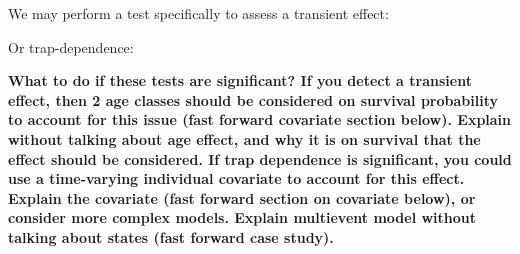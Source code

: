 \documentclass[
  12pt,
]{krantz}
\newenvironment{Shaded}{\begin{snugshade}}{\end{snugshade}}
\newcommand{\DocumentationTok}[1]{\textcolor[rgb]{0.56,0.35,0.01}{\textbf{\textit{#1}}}}
\newcommand{\FunctionTok}[1]{\textcolor[rgb]{0.13,0.29,0.53}{\textbf{#1}}}
\newcommand{\NormalTok}[1]{#1}
\begin{document}
We may perform a test specifically to assess a transient effect:

\begin{Shaded}
\end{Shaded}

Or trap-dependence:

\begin{Shaded}
\end{Shaded}

\textbf{What to do if these tests are significant? If you detect a transient effect, then 2 age classes should be considered on survival probability to account for this issue (fast forward covariate section below). Explain without talking about age effect, and why it is on survival that the effect should be considered. If trap dependence is significant, you could use a time-varying individual covariate to account for this effect. Explain the covariate (fast forward section on covariate below), or consider more complex models. Explain multievent model without talking about states (fast forward case study).}
\end{document}
